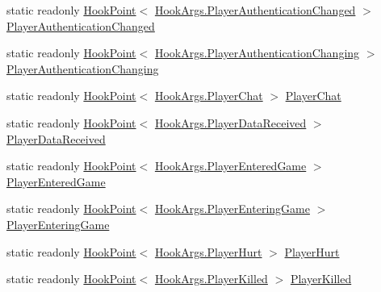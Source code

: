 \begin{DoxyCompactItemize}
static readonly \hyperlink{classOTA_1_1Plugin_1_1HookPoint}{Hook\+Point}$<$ \hyperlink{structOTA_1_1Plugin_1_1HookArgs_1_1PlayerAuthenticationChanged}{Hook\+Args.\+Player\+Authentication\+Changed} $>$ \hyperlink{classOTA_1_1Plugin_1_1HookPoints_ad2106fcd02668231220ffbd8ffea8c3b}{Player\+Authentication\+Changed}
\item 
static readonly \hyperlink{classOTA_1_1Plugin_1_1HookPoint}{Hook\+Point}$<$ \hyperlink{structOTA_1_1Plugin_1_1HookArgs_1_1PlayerAuthenticationChanging}{Hook\+Args.\+Player\+Authentication\+Changing} $>$ \hyperlink{classOTA_1_1Plugin_1_1HookPoints_a8acb31d9912a8a050c2a356bce2f6f48}{Player\+Authentication\+Changing}
\item 
static readonly \hyperlink{classOTA_1_1Plugin_1_1HookPoint}{Hook\+Point}$<$ \hyperlink{structOTA_1_1Plugin_1_1HookArgs_1_1PlayerChat}{Hook\+Args.\+Player\+Chat} $>$ \hyperlink{classOTA_1_1Plugin_1_1HookPoints_abfc85141553f833b30a7989237809438}{Player\+Chat}
\item 
static readonly \hyperlink{classOTA_1_1Plugin_1_1HookPoint}{Hook\+Point}$<$ \hyperlink{structOTA_1_1Plugin_1_1HookArgs_1_1PlayerDataReceived}{Hook\+Args.\+Player\+Data\+Received} $>$ \hyperlink{classOTA_1_1Plugin_1_1HookPoints_aa9271d6c6ab7230de2fdc020f30e0e64}{Player\+Data\+Received}
\item 
static readonly \hyperlink{classOTA_1_1Plugin_1_1HookPoint}{Hook\+Point}$<$ \hyperlink{structOTA_1_1Plugin_1_1HookArgs_1_1PlayerEnteredGame}{Hook\+Args.\+Player\+Entered\+Game} $>$ \hyperlink{classOTA_1_1Plugin_1_1HookPoints_a5bca8b65b0bb25f931361b2c16b21766}{Player\+Entered\+Game}
\item 
static readonly \hyperlink{classOTA_1_1Plugin_1_1HookPoint}{Hook\+Point}$<$ \hyperlink{structOTA_1_1Plugin_1_1HookArgs_1_1PlayerEnteringGame}{Hook\+Args.\+Player\+Entering\+Game} $>$ \hyperlink{classOTA_1_1Plugin_1_1HookPoints_a170ea8ab2ef4cc9097564dc1a90173b7}{Player\+Entering\+Game}
\item 
static readonly \hyperlink{classOTA_1_1Plugin_1_1HookPoint}{Hook\+Point}$<$ \hyperlink{structOTA_1_1Plugin_1_1HookArgs_1_1PlayerHurt}{Hook\+Args.\+Player\+Hurt} $>$ \hyperlink{classOTA_1_1Plugin_1_1HookPoints_a689d890c7bce1a55d2ab26359a152592}{Player\+Hurt}
\item 
static readonly \hyperlink{classOTA_1_1Plugin_1_1HookPoint}{Hook\+Point}$<$ \hyperlink{structOTA_1_1Plugin_1_1HookArgs_1_1PlayerKilled}{Hook\+Args.\+Player\+Killed} $>$ \hyperlink{classOTA_1_1Plugin_1_1HookPoints_a94707524a3dc9e8111f2ab07ce93e348}{Player\+Killed}
\item 

\end{DoxyCompactItemize}
